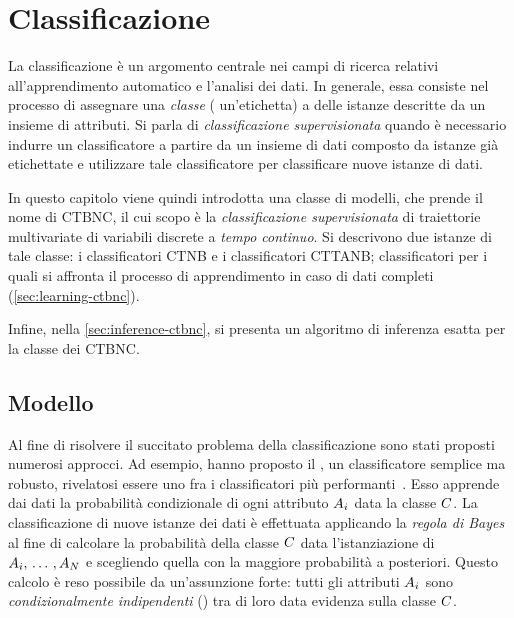 
\chapter{Classificazione}
\label{cap:ctbnc}
La classificazione è un argomento centrale nei campi di ricerca relativi all'apprendimento automatico e l'analisi dei dati. In generale, essa consiste nel processo di assegnare una \emph{classe} (\ie{} un'etichetta) a delle istanze descritte da un insieme di attributi. Si parla di \emph{classificazione supervisionata} quando è necessario indurre un classificatore a partire da un insieme di dati composto da istanze già etichettate e utilizzare tale classificatore per classificare nuove istanze di dati.

In questo capitolo viene quindi introdotta una classe di modelli, che prende il nome di \acf{CTBNC}, il cui scopo è la \emph{classificazione supervisionata} di traiettorie multivariate di variabili discrete a \emph{tempo continuo}. Si descrivono due istanze di tale classe: i classificatori \acf{CTNB} e i classificatori \acf{CTTANB}; classificatori per i quali si affronta il processo di apprendimento in caso di dati completi (\autoref{sec:learning-ctbnc}).

Infine, nella \autoref{sec:inference-ctbnc}, si presenta un algoritmo di inferenza esatta per la classe dei \acs{CTBNC}.

\section{Modello}\label{sec:ctbnc-model}
Al fine di risolvere il succitato problema della classificazione sono stati proposti numerosi approcci. Ad esempio, \citet{DudaHart1973} hanno proposto il \lwcase \nb{} \class{}, un classificatore semplice ma robusto, rivelatosi essere uno fra i classificatori più performanti~\citep{Langley1992}. Esso apprende dai dati la probabilità condizionale di ogni attributo $\mathnormal{A}_i$ data la classe $\mathnormal{C}$. La classificazione di nuove istanze dei dati è effettuata applicando la \emph{regola di Bayes} al fine di calcolare la probabilità della classe $\mathnormal{C}$ data l'istanziazione di $\mathnormal{A}_i,\,\dotsc\,,\mathnormal{A}_N$ e scegliendo quella con la maggiore probabilità a posteriori. Questo calcolo è reso possibile da un'assunzione forte: tutti gli attributi $\mathnormal{A}_i$ sono \emph{condizionalmente indipendenti} () tra di loro data evidenza sulla classe $\mathnormal{C}$.

